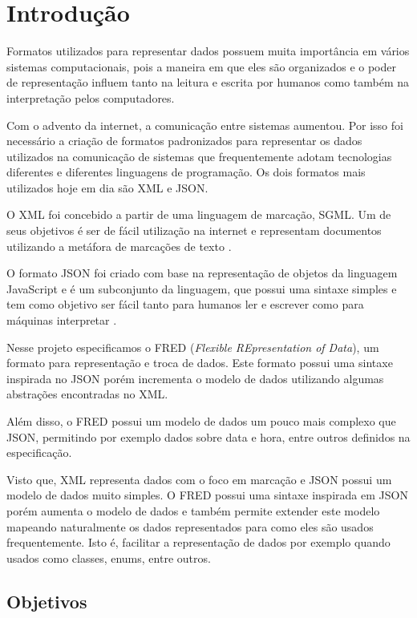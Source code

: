 \chapter[Introdução]{Introdução}

Formatos utilizados para representar dados possuem muita importância 
em vários sistemas computacionais, pois a maneira em que eles são organizados
e o poder de representação influem tanto na leitura e escrita por humanos como também 
na interpretação pelos computadores.

Com o advento da internet, a comunicação entre sistemas aumentou.
Por isso foi necessário a criação de formatos padronizados para representar
os dados utilizados na comunicação de sistemas que frequentemente adotam 
tecnologias diferentes e diferentes linguagens de programação. 
Os dois formatos mais utilizados hoje em dia são XML e JSON.

O XML foi concebido a partir de uma linguagem de marcação, SGML.
Um de seus objetivos é ser de fácil utilização na internet e representam 
documentos utilizando a metáfora de marcações de texto \cite{XML}.

O formato JSON foi criado com base na representação de objetos 
da linguagem JavaScript e é um subconjunto da linguagem, que
possui uma sintaxe simples e tem como objetivo ser fácil tanto para 
humanos ler e escrever como para máquinas interpretar \cite{ecma404}.

Nesse projeto especificamos o FRED (\textit{Flexible REpresentation of Data}), 
um formato para representação e troca de dados. Este formato possui uma sintaxe
inspirada no JSON porém incrementa o modelo de dados utilizando algumas 
abstrações encontradas no XML.

Além disso, o FRED possui um modelo de dados um pouco mais complexo que JSON,
permitindo por exemplo dados sobre data e hora, entre outros
definidos na especificação.

Visto que, XML representa dados com o foco em marcação e JSON 
possui um modelo de dados muito simples. O FRED possui uma sintaxe
inspirada em JSON porém aumenta o modelo
de dados e também permite extender este modelo mapeando naturalmente os 
dados representados para como eles são usados 
frequentemente. Isto é, facilitar a representação de dados por exemplo
quando usados como classes, enums, entre outros.



\section{Objetivos}
\label{sec:objective}


